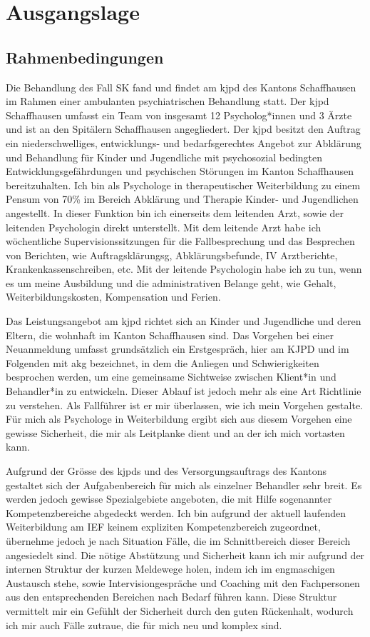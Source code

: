 \section{Ausgangslage} \label{Ausgangslage}
\subsection{Rahmenbedingungen}
Die Behandlung des Fall SK fand und findet am \ac{kjpd} des Kantons Schaffhausen im Rahmen einer ambulanten psychiatrischen Behandlung statt. Der \ac{kjpd} Schaffhausen umfasst ein Team von insgesamt 12 Psycholog*innen und 3 Ärzte und ist an den Spitälern Schaffhausen angegliedert. Der \ac{kjpd} besitzt den Auftrag ein niederschwelliges, entwicklungs- und bedarfsgerechtes Angebot zur Abklärung und Behandlung für Kinder und Jugendliche mit psychosozial bedingten Entwicklungsgefährdungen und psychischen Störungen im Kanton Schaffhausen bereitzuhalten. Ich bin als Psychologe in therapeutischer Weiterbildung zu einem Pensum von 70\% im Bereich Abklärung und Therapie Kinder- und Jugendlichen angestellt. In dieser Funktion bin ich einerseits dem leitenden Arzt, sowie der leitenden Psychologin direkt unterstellt. Mit dem leitende Arzt habe ich wöchentliche Supervisionssitzungen für die Fallbesprechung und das Besprechen von Berichten, wie Auftragsklärungsg,  Abklärungsbefunde, IV Arztberichte, Krankenkassenschreiben, etc. Mit der leitende Psychologin habe ich zu tun, wenn es um meine Ausbildung und die administrativen Belange geht, wie Gehalt, Weiterbildungskosten, Kompensation und Ferien. 

Das Leistungsangebot am \ac{kjpd} richtet sich an Kinder und Jugendliche und deren Eltern, die wohnhaft im Kanton Schaffhausen sind. Das Vorgehen bei einer Neuanmeldung umfasst grundsätzlich ein Erstgespräch, hier am KJPD und im Folgenden mit \ac{akg} bezeichnet, in dem die Anliegen und Schwierigkeiten besprochen werden, um eine gemeinsame Sichtweise zwischen Klient*in und Behandler*in zu entwickeln. Dieser Ablauf ist jedoch mehr als eine Art Richtlinie zu verstehen. Als Fallführer ist er mir überlassen, wie ich mein Vorgehen gestalte. Für mich als Psychologe in Weiterbildung ergibt sich aus diesem Vorgehen eine gewisse Sicherheit, die mir als Leitplanke dient und an der ich mich vortasten kann. 

Aufgrund der Grösse des \ac{kjpd}s und des Versorgungsauftrags des Kantons gestaltet sich der Aufgabenbereich für mich als einzelner Behandler sehr breit. Es werden jedoch gewisse Spezialgebiete angeboten, die mit Hilfe sogenannter Kompetenzbereiche abgedeckt werden. Ich bin aufgrund der aktuell laufenden Weiterbildung am IEF keinem expliziten Kompetenzbereich zugeordnet, übernehme jedoch je nach Situation Fälle, die im Schnittbereich dieser Bereich angesiedelt sind. Die nötige Abstützung und Sicherheit kann ich mir aufgrund der internen Struktur der kurzen Meldewege holen, indem ich im engmaschigen Austausch stehe, sowie Intervisiongespräche und Coaching mit den Fachpersonen aus den entsprechenden Bereichen nach Bedarf führen kann. Diese Struktur vermittelt mir ein Gefühlt der Sicherheit durch den guten Rückenhalt, wodurch ich mir auch Fälle zutraue, die für mich neu und komplex sind. 


